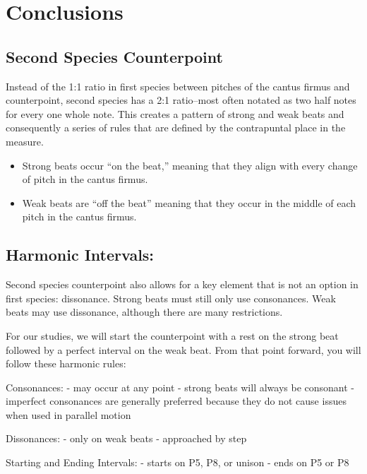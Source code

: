 \documentclass{book}
\providecommand{\tightlist}{%
  \setlength{\itemsep}{0pt}\setlength{\parskip}{0pt}}
\begin{document}
\hypertarget{conclusions-48}{%
\section{Conclusions}\label{conclusions-48}}

\hypertarget{second-species-counterpoint}{%
\subsection{Second Species Counterpoint}\label{second-species-counterpoint}}

Instead of the 1:1 ratio in first species between pitches of the cantus firmus
and counterpoint, second species has a 2:1 ratio--most often notated as two
half notes for every one whole note. This creates a pattern of strong and weak
beats and consequently a series of rules that are defined by the contrapuntal
place in the measure.

\begin{itemize}
\tightlist
\item
  Strong beats occur ``on the beat,'' meaning that they align with every
  change of pitch in the cantus firmus.
\item
  Weak beats are ``off the beat'' meaning that they occur in the middle of
  each pitch in the cantus firmus.
\end{itemize}

\hypertarget{harmonic-intervals}{%
\subsection{Harmonic Intervals:}\label{harmonic-intervals}}

Second species counterpoint also allows for a key element that is not an
option in first species: dissonance. Strong beats must still only use
consonances. Weak beats may use dissonance, although there are many
restrictions.

For our studies, we will start the counterpoint with a rest on the strong beat
followed by a perfect interval on the weak beat. From that point forward, you
will follow these harmonic rules:

Consonances: - may occur at any point - strong beats will always be consonant
- imperfect consonances are generally preferred because they do not cause
issues when used in parallel motion

Dissonances: - only on weak beats - approached by step

Starting and Ending Intervals: - starts on P5, P8, or unison - ends on P5 or
P8
\end{document}
